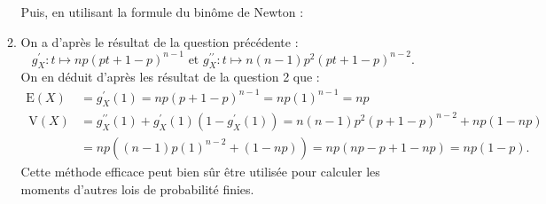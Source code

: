\begin{correction}
\begin{enumerate}
\begin{enumerate}
Puis,  en utilisant la formule du binôme de Newton :
\item On a d'après le résultat de la question précédente :
$$
g_{X}^{\prime}: t \mapsto n p(p t+1-p)^{n-1} \text { et } g_{X}^{\prime \prime}: t \mapsto n(n-1) p^{2}(p t+1-p)^{n-2} .
$$
On en déduit d'après les résultat de la question 2 que :
$$
\begin{aligned}
\mathrm{E}(X) &=g_{X}^{\prime}(1)=n p(p+1-p)^{n-1}=n p(1)^{n-1}=n p \\
\mathrm{~V}(X) &=g_{X}^{\prime \prime}(1)+g_{X}^{\prime}(1)\left(1-g_{X}^{\prime}(1)\right)=n(n-1) p^{2}(p+1-p)^{n-2}+n p(1-n p) \\
&=n p\left((n-1) p(1)^{n-2}+(1-n p)\right)=n p(n p-p+1-n p)=n p(1-p) .
\end{aligned}
$$
Cette méthode efficace peut bien sûr être utilisée pour calculer les moments d'autres lois de probabilité finies.

\end{enumerate}
\end{enumerate}





\end{correction}